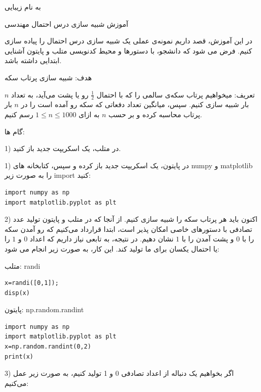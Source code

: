 \documentclass{article}
\begin{document}
\LARGE
\begin{center}

به نام زیبایی


آموزش شبیه سازی درس احتمال مهندسی

\end{center}
\hrulefill
\large

در این آموزش، قصد داریم نمونه‌ی عملی یک شبیه سازی درس احتمال را پیاده سازی کنیم. فرض می شود که دانشجو، با دستورها و محیط کدنویسی متلب و پایتون آشنایی ابتدایی داشته باشد.

هدف: شبیه سازی پرتاب سکه

تعریف: میخواهیم پرتاب سکه‌ی سالمی را که با احتمال
$
\frac{1}{2}
$
رو یا پشت می‌آید، به تعداد
$
n
$
بار شبیه سازی کنیم. سپس، میانگین تعداد دفعاتی که سکه رو آمده است را در
$
n
$
بار پرتاب محاسبه کرده و بر حسب 
$
n
$
به ازای
$
1\le n\le 1000
$
رسم کنیم.

گام ها:

1) در متلب، یک اسکریپت جدید باز کنید.

1) در پایتون، یک اسکریپت جدید باز کرده و سپس، کتابخانه های numpy و matplotlib را به صورت زیر import کنید:

\begin{verbatim}
import numpy as np
import matplotlib.pyplot as plt
\end{verbatim}

2) اکنون باید هر پرتاب سکه را شبیه سازی کنیم. از آنجا که در متلب و پایتون تولید عدد تصادفی با دستورهای خاصی امکان پذیر است، ابتدا قرارداد می‌کنیم که رو آمدن سکه را با $0$ و پشت آمدن را با $1$ نشان دهیم. در نتیجه، به تابعی نیاز داریم که اعداد $0$ و $1$ را یا احتمال یکسان برای ما تولید کند. این کار، به صورت زیر انجام می شود:

متلب: randi

\begin{verbatim}
x=randi([0,1]);
disp(x)
\end{verbatim}

پایتون: np.random.randint

\begin{verbatim}
import numpy as np
import matplotlib.pyplot as plt
x=np.random.randint(0,2)
print(x)
\end{verbatim}

3) اگر بخواهیم یک دنباله از اعداد تصادفی 0 و 1 تولید کنیم، به صورت زیر عمل می‌کنیم:
\end{document}
